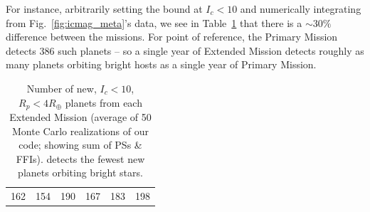 For instance, arbitrarily setting the bound at $I_c<10$ and numerically 
integrating from Fig.~\ref{fig:icmag_meta}'s data, we see in 
Table~\ref{tab:icmag_meta} that there is a $\sim30\%$ difference between the 
missions.
For point of reference, the Primary Mission detects 386 such planets -- so a single year of Extended Mission detects roughly as many planets orbiting bright hosts as a single year of Primary Mission.
\begin{table}[!ht]
	\centering
	\caption{Number of new, $I_c<10$, $R_p<4R_\oplus$ planets from each Extended Mission (average of 50 Monte Carlo realizations of our code; showing sum of PSs \& FFIs). \npole\:detects the fewest new planets orbiting bright stars.}
	\label{tab:icmag_meta}
	\begin{tabular}{|c|c|c|c|c|c|}
		\hline
		\nhemi & \npole & \shemiAvoid & \elong & \eshort & \hemis \\ \hline
		162    & 154    & 190         & 167    & 183     & 198    \\ \hline
	\end{tabular}
\end{table}

